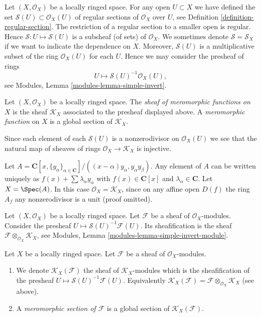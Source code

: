 \medskip\noindent
Let $(X, \mathcal{O}_X)$ be a locally ringed space.
For any open $U \subset X$ we have defined the set
$\mathcal{S}(U) \subset \mathcal{O}_X(U)$
of regular sections of $\mathcal{O}_X$ over $U$, see
Definition \ref{definition-regular-section}. The restriction
of a regular section to a smaller open is regular. Hence
$\mathcal{S} : U \mapsto \mathcal{S}(U)$ is a subsheaf (of sets)
of $\mathcal{O}_X$. We sometimes denote $\mathcal{S} = \mathcal{S}_X$
if we want to indicate the dependence on $X$.
Moreover, $\mathcal{S}(U)$
is a multiplicative subset of the ring $\mathcal{O}_X(U)$ for
each $U$. Hence we may consider
the presheaf of rings
$$
U \longmapsto \mathcal{S}(U)^{-1} \mathcal{O}_X(U),
$$
see Modules, Lemma \ref{modules-lemma-simple-invert}.

\begin{definition}
\label{definition-sheaf-meromorphic-functions}
Let $(X, \mathcal{O}_X)$ be a locally ringed space.
The {\it sheaf of meromorphic functions on $X$} is
the sheaf {\it $\mathcal{K}_X$} associated to the presheaf
displayed above. A {\it meromorphic function} on $X$
is a global section of $\mathcal{K}_X$.
\end{definition}

\noindent
Since each element of each $\mathcal{S}(U)$ is a nonzerodivisor on
$\mathcal{O}_X(U)$ we see that the natural map of sheaves
of rings $\mathcal{O}_X \to \mathcal{K}_X$ is injective.

\begin{example}
\label{example-no-change}
Let $A = \mathbf{C}[x, \{y_\alpha\}_{\alpha \in \mathbf{C}}]/
((x - \alpha)y_\alpha, y_\alpha y_\beta)$. Any element of $A$
can be written uniquely as
$f(x) + \sum \lambda_\alpha y_\alpha$ with $f(x) \in \mathbf{C}[x]$
and $\lambda_\alpha \in \mathbf{C}$.
Let $X = \Spec(A)$.
In this case $\mathcal{O}_X = \mathcal{K}_X$, since on
any affine open $D(f)$ the ring $A_f$ any nonzerodivisor is
a unit (proof omitted).
\end{example}

\noindent
Let $(X, \mathcal{O}_X)$ be a locally ringed space.
Let $\mathcal{F}$ be a sheaf of $\mathcal{O}_X$-modules.
Consider the presheaf $U \mapsto \mathcal{S}(U)^{-1}\mathcal{F}(U)$.
Its sheafification is the sheaf
$\mathcal{F} \otimes_{\mathcal{O}_X} \mathcal{K}_X$, see
Modules, Lemma \ref{modules-lemma-simple-invert-module}.

\begin{definition}
\label{definition-meromorphic-section}
Let $X$ be a locally ringed space.
Let $\mathcal{F}$ be a sheaf of $\mathcal{O}_X$-modules.
\begin{enumerate}
\item We denote
$\mathcal{K}_X(\mathcal{F})$
the sheaf of $\mathcal{K}_X$-modules which is
the sheafification of the presheaf
$U \mapsto \mathcal{S}(U)^{-1}\mathcal{F}(U)$. Equivalently
$\mathcal{K}_X(\mathcal{F}) =
\mathcal{F} \otimes_{\mathcal{O}_X} \mathcal{K}_X$ (see above).
\item A {\it meromorphic section of $\mathcal{F}$}
is a global section of $\mathcal{K}_X(\mathcal{F})$.
\end{enumerate}
\end{definition}

